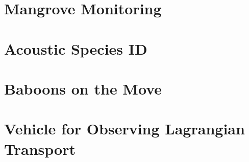 \section{Mangrove Monitoring}

\section{Acoustic Species ID}

\section{Baboons on the Move}

\section{Vehicle for Observing Lagrangian Transport}

